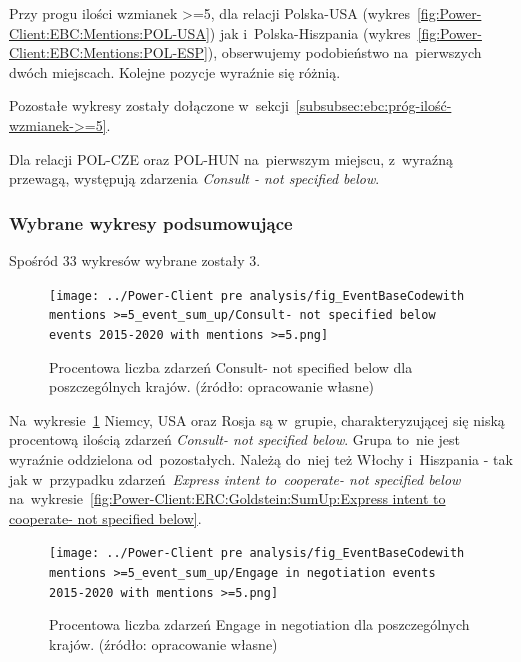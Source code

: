\documentclass[11pt]{report}
\begin{document}
    Przy progu ilości wzmianek >=5, dla relacji Polska-USA (wykres~\ref{fig:Power-Client:EBC:Mentions:POL-USA}) jak i~Polska-Hiszpania (wykres~\ref{fig:Power-Client:EBC:Mentions:POL-ESP}),
    obserwujemy podobieństwo na~pierwszych dwóch miejscach.
    Kolejne pozycje wyraźnie się różnią.

    Pozostałe wykresy zostały dołączone w~sekcji~\ref{subsubsec:ebc:próg-ilość-wzmianek->=5}.

    Dla relacji POL-CZE oraz POL-HUN na~pierwszym miejscu, z~wyraźną przewagą, występują zdarzenia \textit{Consult - not specified below}.

    \subsubsection{Wybrane wykresy podsumowujące}

    Spośród 33 wykresów wybrane zostały 3.

    \begin{figure}[tp]
        \centering
        \texttt{[image: ../Power-Client pre analysis/fig\_EventBaseCodewith mentions >=5\_event\_sum\_up/Consult- not specified below events 2015-2020 with mentions >=5.png]}
        \caption{Procentowa liczba zdarzeń Consult- not specified below dla poszczególnych krajów. (źródło: opracowanie własne)}
        \label{fig:Power-Client:ERC:Mentions:SumUp:Consult- not specified below}
    \end{figure}

    Na~wykresie~\ref{fig:Power-Client:ERC:Mentions:SumUp:Consult- not specified below} Niemcy, USA oraz Rosja są w~grupie,
    charakteryzującej się niską procentową ilością zdarzeń \textit{Consult- not specified below}.
    Grupa to~nie jest wyraźnie oddzielona od~pozostałych.
    Należą do~niej też Włochy i~Hiszpania - tak jak w~przypadku zdarzeń~\textit{Express intent to~cooperate- not specified below}
    na~wykresie~\ref{fig:Power-Client:ERC:Goldstein:SumUp:Express intent to cooperate- not specified below}.

    \begin{figure}[tp]
        \centering
        \texttt{[image: ../Power-Client pre analysis/fig\_EventBaseCodewith mentions >=5\_event\_sum\_up/Engage in negotiation events 2015-2020 with mentions >=5.png]}
        \caption{Procentowa liczba zdarzeń Engage in negotiation dla poszczególnych krajów. (źródło: opracowanie własne)}
        \label{fig:Power-Client:ERC:Mentions:SumUp:Engage in negotiation}
    \end{figure}
\end{document}
